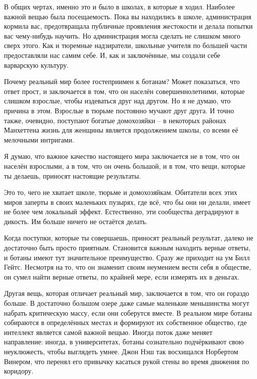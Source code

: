 \documentclass[ebook,12pt,oneside,openany]{memoir}
\begin{document}
В общих чертах, именно это и было в школах, в которые я ходил.
Наиболее важной вещью была посещаемость. Пока вы находились в школе,
администрация кормила вас, предотвращала публичные проявления
жестокости и делала попытки вас чему-нибудь научить. Но администрация
могла сделать не слишком много сверх этого. Как и тюремные
надзиратели, школьные учителя по большей части предоставляли нас самим
себе. И, как и заключённые, мы создали себе варварскую культуру.


Почему реальный мир более гостеприимен к ботанам? Может показаться,
что ответ прост, и заключается в том, что он населён
совершеннолетними, которые слишком взрослые, чтобы издеваться друг над
другом. Но я не думаю, что причина в этом. Взрослые в тюрьме постоянно
мучают друг друга. И точно также, очевидно, поступают богатые
домохозяйки – в некоторых районах Манхеттена жизнь для женщины
является продолжением школы, со всеми её мелочными интригами.

Я думаю, что важное качество настоящего мира заключается не в том, что
он населён взрослыми, а в том, что он очень большой, и в том, что
вещи, которые ты делаешь, приносят настоящие результаты.

Это то, чего не хватает школе, тюрьме и домохозяйкам. Обитатели всех
этих миров заперты в своих маленьких пузырях, где всё, что бы они ни
делали, имеет не более чем локальный эффект. Естественно, эти
сообщества деградируют в дикость. Им больше ничего не остаётся делать.

Когда поступки, которые ты совершаешь, приносят реальный результат,
далеко не достаточно быть просто приятным. Становится важным находить
верные ответы, и ботаны имеют тут значительное преимущество. Сразу же
приходит на ум Билл Гейтс. Несмотря на то, что он знаменит своим
неумением вести себя в обществе, он сумел найти верные ответы, по
крайней мере, если измерять их в деньгах.

Другая вещь, которая отличает реальный мир, заключается в том, что он
гораздо больше. В достаточно большом озере даже самые маленькие
меньшинства могут набрать критическую массу, если они соберутся
вместе. В реальном мире ботаны собираются в определённых местах и
формируют их собственное общество, где интеллект является самой важной
вещью. Иногда поток даже меняет направление: иногда, в университетах,
ботаны сознательно подчёркивают свою неуклюжесть, чтобы выглядеть
умнее. Джон Нэш так восхищался Норбертом Винером, что перенял его
привычку касаться рукой стены во время движения по коридору.
\end{document}
